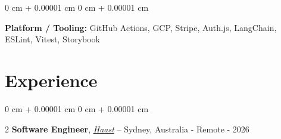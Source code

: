 \documentclass[10pt, a4paper]{article}
\newenvironment{onecolentry}{ \begin{adjustwidth}{ 0 cm + 0.00001 cm }{ 0 cm + 0.00001 cm }
}{ \end{adjustwidth} } %
\newenvironment{twocolentry}[2][]{ \onecolentry \def\secondColumn{#2} \setcolumnwidth{\fill, 4.5 cm}
\begin{paracol}{2} }{ \switchcolumn \raggedleft \secondColumn \end{paracol}
\endonecolentry } %
\begin{document}
	\vspace{0.2 cm}

	\begin{onecolentry}
		\textbf{Platform / Tooling:} GitHub Actions, GCP, Stripe, Auth.js, LangChain,
		ESLint, Vitest, Storybook
	\end{onecolentry}

	\section{Experience}

	\begin{twocolentry}
		{2023 - 2026} \textbf{Software Engineer}, \href{https://www.haast.io}{\underline{\textit{Haast}}}
		-- Sydney, Australia - Remote
	\end{twocolentry}

	\vspace{0.1 cm}
\end{document}

